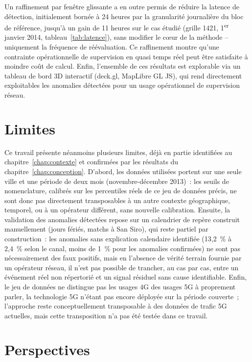 Un raffinement par fenêtre glissante a en outre permis de réduire la
latence de détection, initialement bornée à 24 heures par la
granularité journalière du bloc de référence, jusqu'à un gain de
11 heures sur le cas étudié (grille 1421, 1\textsuperscript{er} janvier
2014, tableau~\ref{tab:latence}), sans modifier le cœur de la méthode
-- uniquement la fréquence de réévaluation. Ce raffinement montre
qu'une contrainte opérationnelle de supervision en quasi temps réel
peut être satisfaite à moindre coût de calcul. Enfin, l'ensemble de
ces résultats est explorable via un tableau de bord 3D interactif
(deck.gl, MapLibre GL JS), qui rend directement exploitables les
anomalies détectées pour un usage opérationnel de supervision réseau.

\section*{Limites}

Ce travail présente néanmoins plusieurs limites, déjà en partie
identifiées au chapitre~\ref{chap:contexte} et confirmées par les
résultats du chapitre~\ref{chap:conception}. D'abord, les données
utilisées portent sur une seule ville et une période de deux mois
(novembre-décembre 2013)~: les seuils de nomenclature, calibrés sur
les percentiles réels de ce jeu de données précis, ne sont donc pas
directement transposables à un autre contexte géographique, temporel,
ou à un opérateur différent, sans nouvelle calibration. Ensuite, la
validation des anomalies détectées repose sur un calendrier de repère
construit manuellement (jours fériés, matchs à San Siro), qui reste
partiel par construction~: les anomalies sans explication calendaire
identifiée (13,2~\% à 2,4~\% selon le canal, moins de 1~\% pour les
anomalies confirmées) ne sont pas nécessairement des faux positifs,
mais en l'absence de vérité terrain fournie par un opérateur réseau,
il n'est pas possible de trancher, au cas par cas, entre un événement
réel non répertorié et un signal résiduel sans cause identifiable.
Enfin, le jeu de données ne distingue pas les usages 4G des usages 5G
à proprement parler, la technologie 5G n'étant pas encore déployée
sur la période couverte~; l'approche reste conceptuellement
transposable à des données de trafic 5G actuelles, mais cette
transposition n'a pas été testée dans ce travail.

\section*{Perspectives}

